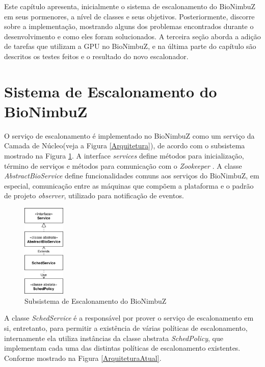 
Este capítulo apresenta, inicialmente o sistema de escalonamento do BioNimbuZ em seus pormenores, a nível de classes e seus objetivos. Posteriormente, discorre sobre a implementação, mostrando alguns dos problemas encontrados durante o desenvolvimento e como eles foram solucionados. A terceira seção aborda a adição de tarefas que utilizam a \acrshort{GPU} no BioNimbuZ, e na última parte do capítulo são descritos os testes feitos e o resultado do novo escalonador.

\section{Sistema de Escalonamento do BioNimbuZ}

O serviço de escalonamento é implementado no BioNimbuZ como um serviço da Camada de Núcleo(veja a Figura \ref{Arquitetura}), de acordo com o subsistema mostrado na Figura \ref{SubsistemaDeEscalonamento}. A interface \textit{services} define métodos para inicialização, término de serviços e métodos para comunicação com o \textit{Zookeeper} \cite{Zookeeper}. A classe \textit{AbstractBioService} define funcionalidades comuns aos serviços do BioNimbuZ, em especial, comunicação entre as máquinas que compõem a plataforma e o padrão de projeto \textit{observer}, utilizado para notificação de eventos.
\begin{figure}[htbp]
	\centerline{\includegraphics[width=2cm]{img/SubsistemaDeEscalonamento.png}}
	\caption{Subsistema de Escalonamento do BioNimbuZ}
	\label{SubsistemaDeEscalonamento}
\end{figure}

A classe \textit{SchedService} é a responsável por prover o serviço de escalonamento em si, entretanto, para permitir a existência de várias políticas de escalonamento, internamente ela utiliza instâncias da classe abstrata \textit{SchedPolicy}, que implementam cada uma das distintas políticas de escalonamento existentes. Conforme mostrado na Figura \ref{ArquiteturaAtual}.

